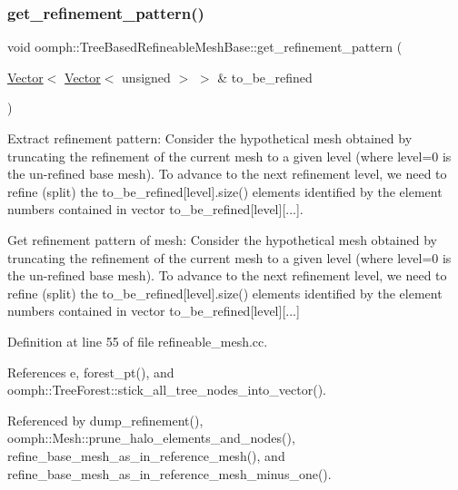 \subsubsection{\texorpdfstring{get\+\_\+refinement\+\_\+pattern()}{get\_refinement\_pattern()}}
{\footnotesize\ttfamily void oomph\+::\+Tree\+Based\+Refineable\+Mesh\+Base\+::get\+\_\+refinement\+\_\+pattern (\begin{DoxyParamCaption}\item[{\hyperlink{classoomph_1_1Vector}{Vector}$<$ \hyperlink{classoomph_1_1Vector}{Vector}$<$ unsigned $>$ $>$ \&}]{to\+\_\+be\+\_\+refined }\end{DoxyParamCaption})\hspace{0.3cm}{\ttfamily [virtual]}}



Extract refinement pattern\+: Consider the hypothetical mesh obtained by truncating the refinement of the current mesh to a given level (where {\ttfamily level=0} is the un-\/refined base mesh). To advance to the next refinement level, we need to refine (split) the {\ttfamily to\+\_\+be\+\_\+refined}\mbox{[}level\mbox{]}.size() elements identified by the element numbers contained in {\ttfamily vector} to\+\_\+be\+\_\+refined\mbox{[}level\mbox{]}\mbox{[}...\mbox{]}. 

Get refinement pattern of mesh\+: Consider the hypothetical mesh obtained by truncating the refinement of the current mesh to a given level (where {\ttfamily level=0} is the un-\/refined base mesh). To advance to the next refinement level, we need to refine (split) the {\ttfamily to\+\_\+be\+\_\+refined}\mbox{[}level\mbox{]}.size() elements identified by the element numbers contained in {\ttfamily vector} to\+\_\+be\+\_\+refined\mbox{[}level\mbox{]}\mbox{[}...\mbox{]} 

Definition at line 55 of file refineable\+\_\+mesh.\+cc.



References e, forest\+\_\+pt(), and oomph\+::\+Tree\+Forest\+::stick\+\_\+all\+\_\+tree\+\_\+nodes\+\_\+into\+\_\+vector().



Referenced by dump\+\_\+refinement(), oomph\+::\+Mesh\+::prune\+\_\+halo\+\_\+elements\+\_\+and\+\_\+nodes(), refine\+\_\+base\+\_\+mesh\+\_\+as\+\_\+in\+\_\+reference\+\_\+mesh(), and refine\+\_\+base\+\_\+mesh\+\_\+as\+\_\+in\+\_\+reference\+\_\+mesh\+\_\+minus\+\_\+one().

\mbox{\label{classoomph_1_1TreeBasedRefineableMeshBase_a957a33d2b7dd59f8789f4d0e9c6357c2}} 
